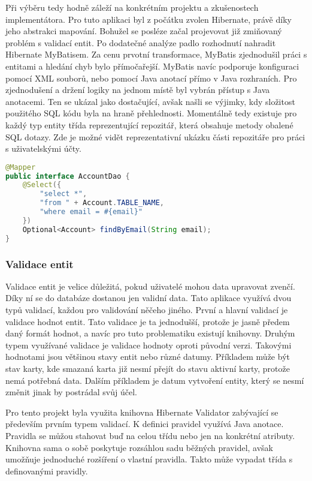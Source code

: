 		Při výběru tedy hodně záleží na konkrétním projektu a zkušenostech implementátora.
		Pro tuto aplikaci byl z počátku zvolen Hibernate, právě díky jeho abstrakci mapování.
		Bohužel se posléze začal projevovat již zmiňovaný problém s validací entit.
		Po dodatečné analýze padlo rozhodnutí nahradit Hibernate MyBatisem.
		Za cenu prvotní transformace, MyBatis zjednodušil práci s entitami a hledání chyb bylo přímočařejší.
		MyBatis navíc podporuje konfiguraci pomocí \ac{XML} souborů, nebo pomocí Java anotací přímo v Java rozhraních.
		Pro zjednodušení a držení logiky na jednom místě byl vybrán přístup s Java anotacemi.
		Ten se ukázal jako dostačující, avšak našli se výjimky, kdy složitost použitého \ac{SQL} kódu
		byla na hraně přehlednosti.
		Momentálně tedy existuje pro každý typ entity třída reprezentující repozitář, která obsahuje metody obalené \ac{SQL}
		dotazy.
		Zde je možné vidět reprezentativní ukázku části repozitáře pro práci s uživatelskými účty.

		\begin{lstlisting}[language=Java,caption={Ukázka získání uživatelského účtu z databáze MyBatisem. Zdroj: [autor]}]
@Mapper
public interface AccountDao {
	@Select({
		"select *",
		"from " + Account.TABLE_NAME,
		"where email = #{email}"
	})
	Optional<Account> findByEmail(String email);
}
		\end{lstlisting}

		\subsubsection{Validace entit}

		Validace entit je velice důležitá, pokud uživatelé mohou data upravovat zvenčí.
		Díky ní se do databáze dostanou jen validní data.
		Tato aplikace využívá dvou typů validací, každou pro validování něčeho jiného.
		První a hlavní validací je validace hodnot entit.
		Tato validace je ta jednodušší, protože je jasně předem daný formát hodnot, a navíc pro tuto problematiku existují knihovny.
		Druhým typem využívané validace je validace hodnoty oproti původní verzi.
		Takovými hodnotami jsou většinou stavy entit nebo různé datumy.
		Příkladem může být stav karty, kde smazaná karta již nesmí přejít do stavu aktivní karty, protože nemá potřebná data.
		Dalším příkladem je datum vytvoření entity, který se nesmí změnit jinak by postrádal svůj účel.

		Pro tento projekt byla využita knihovna Hibernate Validator zabývající se především prvním typem validací.
		K definici pravidel využívá Java anotace.
		Pravidla se můžou stahovat buď na celou třídu nebo jen na konkrétní atributy.
		Knihovna sama o sobě poskytuje rozsáhlou sadu běžných pravidel, avšak umožňuje jednoduché rozšíření o vlastní
		pravidla.
		Takto může vypadat třída s definovanými pravidly.

